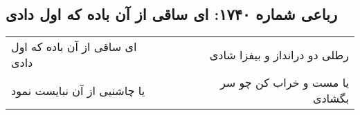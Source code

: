 \begin{center}
\section*{رباعی شماره ۱۷۴۰: ای ساقی از آن باده که اول دادی}
\label{sec:1740}
\begin{longtable}{l p{0.5cm} r}
ای ساقی از آن باده که اول دادی
&&
رطلی دو درانداز و بیفزا شادی
\\
یا چاشنیی از آن نبایست نمود
&&
یا مست و خراب کن چو سر بگشادی
\\
\end{longtable}
\end{center}

